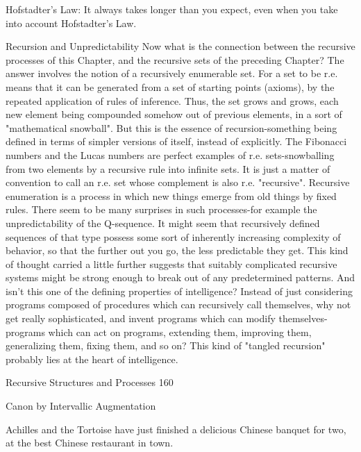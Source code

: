       Hofstadter's Law: It always takes longer than you expect, even when you take into
             account Hofstadter's Law.

                          Recursion and Unpredictability
Now what is the connection between the recursive processes of this Chapter, and the
recursive sets of the preceding Chapter? The answer involves the notion of a recursively
enumerable set. For a set to be r.e. means that it can be generated from a set of starting
points (axioms), by the repeated application of rules of inference. Thus, the set grows and
grows, each new element being compounded somehow out of previous elements, in a sort
of "mathematical snowball". But this is the essence of recursion-something being defined
in terms of simpler versions of itself, instead of explicitly. The Fibonacci numbers and
the Lucas numbers are perfect examples of r.e. sets-snowballing from two elements by a
recursive rule into infinite sets. It is just a matter of convention to call an r.e. set whose
complement is also r.e. "recursive".
        Recursive enumeration is a process in which new things emerge from old things
by fixed rules. There seem to be many surprises in such processes-for example the
unpredictability of the Q-sequence. It might seem that recursively defined sequences of
that type possess some sort of inherently increasing complexity of behavior, so that the
further out you go, the less predictable they get. This kind of thought carried a little
further suggests that suitably complicated recursive systems might be strong enough to
break out of any predetermined patterns. And isn't this one of the defining properties of
intelligence? Instead of just considering programs composed of procedures which can
recursively call themselves, why not get really sophisticated, and invent programs which
can modify themselves-programs which can act on programs, extending them, improving
them, generalizing them, fixing them, and so on? This kind of "tangled recursion"
probably lies at the heart of intelligence.




Recursive Structures and Processes                                                        160

                                       Canon
                            by Intervallic Augmentation

             Achilles and the Tortoise have just finished a delicious Chinese banquet for
             two, at the best Chinese restaurant in town.


